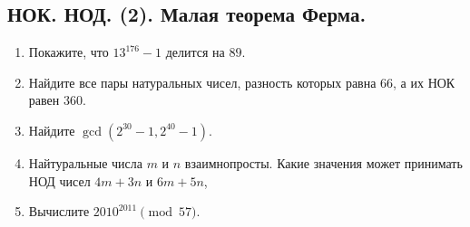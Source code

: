 \documentclass[11pt]{article}
\begin{document}
    \subsection*{НОК. НОД. (2). Малая теорема Ферма.}
    \begin{enumerate}[start=45,label={\bfseries \arabic*.}]
        \item Покажите, что $13^{176} - 1$ делится на $89$.

        \item Найдите все пары натуральных чисел, разность которых равна 66, а их НОК равен 360.

        \item Найдите $\gcd(2^{30} - 1, 2^{40} - 1)$.

        \item Найтуральные числа $m$ и $n$ взаимнопросты. Какие значения может принимать НОД чисел $4m + 3n$ и $6m + 5n$,

        \item  Вычислите  $2010^{2011} \pmod{57}$.
    \end{enumerate}
\end{document}
